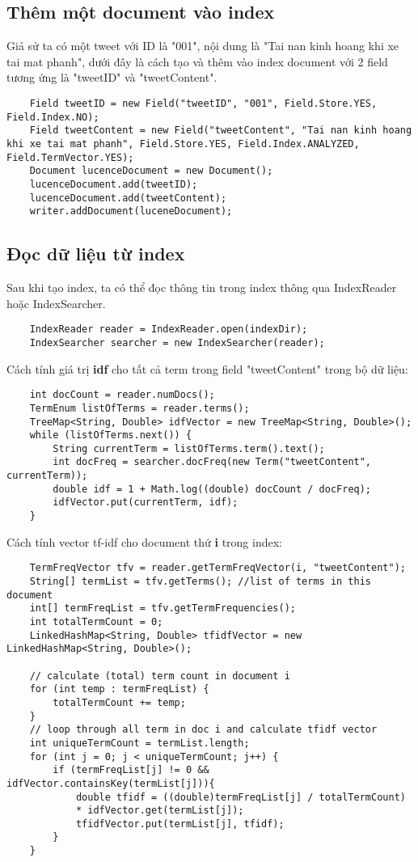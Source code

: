 	\subsection*{Thêm một document vào index}
	Giả sử ta có một tweet với ID là "001", nội dung là "Tai nan kinh hoang khi xe tai mat phanh", dưới đây là cách tạo và thêm vào index document với 2 field tương ứng là "tweetID" và "tweetContent".
	
		\begin{lstlisting}
	Field tweetID = new Field("tweetID", "001", Field.Store.YES, Field.Index.NO);
	Field tweetContent = new Field("tweetContent", "Tai nan kinh hoang khi xe tai mat phanh", Field.Store.YES, Field.Index.ANALYZED, Field.TermVector.YES);				
	Document lucenceDocument = new Document();
	lucenceDocument.add(tweetID);
	lucenceDocument.add(tweetContent);
	writer.addDocument(luceneDocument);
		\end{lstlisting}
		
	\subsection*{Đọc dữ liệu từ index}
	Sau khi tạo index, ta có thể đọc thông tin trong index thông qua IndexReader hoặc IndexSearcher. 
		\begin{lstlisting}
	IndexReader reader = IndexReader.open(indexDir);
	IndexSearcher searcher = new IndexSearcher(reader);
		\end{lstlisting}
	
	Cách tính giá trị \textbf{idf} cho tất cả term trong field "tweetContent" trong bộ dữ liệu:
		\begin{lstlisting}	
	int docCount = reader.numDocs();
	TermEnum listOfTerms = reader.terms();
	TreeMap<String, Double> idfVector = new TreeMap<String, Double>();
	while (listOfTerms.next()) {
		String currentTerm = listOfTerms.term().text();
		int docFreq = searcher.docFreq(new Term("tweetContent", currentTerm));
		double idf = 1 + Math.log((double) docCount / docFreq);
		idfVector.put(currentTerm, idf);
	}
		\end{lstlisting}

	Cách tính vector tf-idf cho document thứ \textbf{i} trong index:	
		\begin{lstlisting}
	TermFreqVector tfv = reader.getTermFreqVector(i, "tweetContent");
	String[] termList = tfv.getTerms(); //list of terms in this document
	int[] termFreqList = tfv.getTermFrequencies();
	int totalTermCount = 0;
	LinkedHashMap<String, Double> tfidfVector = new LinkedHashMap<String, Double>();
	
	// calculate (total) term count in document i
	for (int temp : termFreqList) {
		totalTermCount += temp;
	}
	// loop through all term in doc i and calculate tfidf vector
	int uniqueTermCount = termList.length;
	for (int j = 0; j < uniqueTermCount; j++) {				
		if (termFreqList[j] != 0 && idfVector.containsKey(termList[j])){
			double tfidf = ((double)termFreqList[j] / totalTermCount)
			* idfVector.get(termList[j]);
			tfidfVector.put(termList[j], tfidf);
		}
	}
		\end{lstlisting}
		